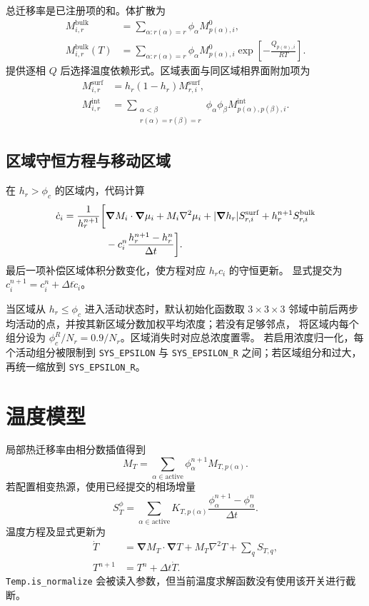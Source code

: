\documentclass[UTF8,a4paper,11pt]{ctexart}
\newcommand{\grad}{\bm{\nabla}}
\newcommand{\code}[1]{\texttt{#1}}
\begin{document}
总迁移率是已注册项的和。体扩散为
\begin{align}
 M_{i,r}^{\mathrm{bulk}}
 &=\sum_{\alpha:r(\alpha)=r}\phi_\alpha
 M^0_{p(\alpha),i},\\
 M_{i,r}^{\mathrm{bulk}}(T)
 &=\sum_{\alpha:r(\alpha)=r}\phi_\alpha M^0_{p(\alpha),i}
 \exp\!\left[-\frac{Q_{p(\alpha),i}}{RT}\right].
\end{align}
提供逐相 $Q$ 后选择温度依赖形式。区域表面与同区域相界面附加项为
\begin{align}
 M_{i,r}^{\mathrm{surf}}&=h_r(1-h_r)M^{\mathrm{surf}}_{r,i},\\
 M_{i,r}^{\mathrm{int}}&=
 \sum_{\substack{\alpha<\beta\\r(\alpha)=r(\beta)=r}}
 \phi_\alpha\phi_\beta M^{\mathrm{int}}_{p(\alpha),p(\beta),i}.
\end{align}

\subsection{区域守恒方程与移动区域}

在 $h_r>\phi_c$ 的区域内，代码计算
\begin{align}
 \dot c_i={1\over h_r^{n+1}}\bigg[&
 \grad M_i\cdot\grad\mu_i+M_i\nabla^2\mu_i
 +|\grad h_r|S^{\mathrm{surf}}_{r,i}
 +h_r^{n+1}S^{\mathrm{bulk}}_{r,i}\nonumber\\
 &-c_i^n\frac{h_r^{n+1}-h_r^n}{\Delta t}\bigg].
 \label{eq:concentration}
\end{align}
最后一项补偿区域体积分数变化，使方程对应 $h_rc_i$ 的守恒更新。
显式提交为 $c_i^{n+1}=c_i^n+\Delta t\dot c_i$。

当区域从 $h_r\le\phi_c$ 进入活动状态时，默认初始化函数取 $3\times3\times3$
邻域中前后两步均活动的点，并按其新区域分数加权平均浓度；若没有足够邻点，
将区域内每个组分设为 $\phi_c^R/N_r=0.9/N_r$。区域消失时对应总浓度置零。
若启用浓度归一化，每个活动组分被限制到
\code{SYS\_EPSILON} 与 \code{SYS\_EPSILON\_R} 之间；若区域组分和过大，
再统一缩放到 \code{SYS\_EPSILON\_R}。

\section{温度模型}

局部热迁移率由相分数插值得到
\begin{equation}
 M_T=\sum_{\alpha\in\mathrm{active}}
 \phi_\alpha^{n+1}M_{T,p(\alpha)}.
\end{equation}
若配置相变热源，使用已经提交的相场增量
\begin{equation}
 S_T^\phi=\sum_{\alpha\in\mathrm{active}}
 K_{T,p(\alpha)}\frac{\phi_\alpha^{n+1}-\phi_\alpha^n}{\Delta t}.
\end{equation}
温度方程及显式更新为
\begin{align}
 \dot T&=\grad M_T\cdot\grad T+M_T\nabla^2T+\sum_qS_{T,q},\\
 T^{n+1}&=T^n+\Delta t\dot T.
 \label{eq:temperature}
\end{align}
\code{Temp.is\_normalize} 会被读入参数，但当前温度求解函数没有使用该开关进行截断。
\end{document}
